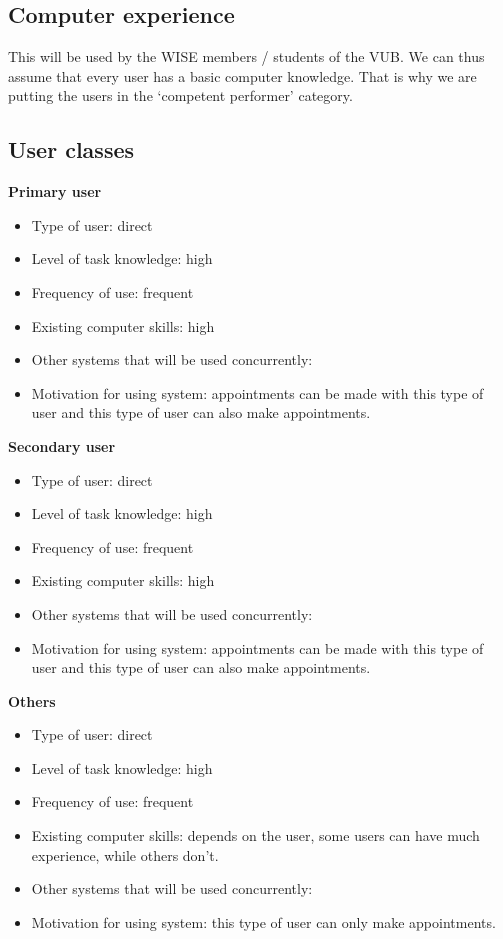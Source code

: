\documentclass[11pt, a4paper,svglistings]{report}
\begin{document}
\subsection{Computer experience}

This will be used by the WISE members / students of the VUB. We can thus assume that every user has a basic computer knowledge. That is why we are putting the users in the `competent performer' category.


\subsection{User classes}

\textbf{Primary user}
\begin{itemize}
\item Type of user: direct
\item Level of task knowledge: high
\item Frequency of use: frequent  
\item Existing computer skills: high 
\item Other systems that will be used concurrently:
\item Motivation for using system: appointments can be made with this type of user and this type of user can also make appointments.
\end{itemize}
\textbf{Secondary user}
\begin{itemize}
\item Type of user: direct
\item  Level of task knowledge: high
\item Frequency of use: frequent
\item Existing computer skills: high 
\item Other systems that will be used concurrently:
\item Motivation for using system: appointments can be made with this type of user and this type of user can also make appointments. 
\end{itemize}
\textbf{Others}
\begin{itemize}
\item Type of user: direct
\item Level of task knowledge: high 
\item Frequency of use: frequent 
\item Existing computer skills: depends on the user, some users can have much experience, while others don’t.
\item Other systems that will be used concurrently: 
\item Motivation for using system: this type of user can only make appointments.
\end{itemize}
\end{document}
